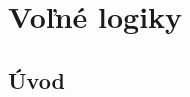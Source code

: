 \documentclass[12pt, letterpaper]{article}
\begin{document}
\pagebreak
\section{Voľné logiky}
\label{flogics}







\subsection{Úvod}
\end{document}
